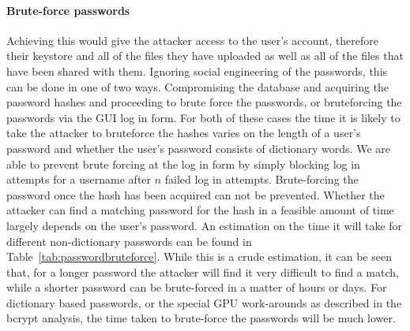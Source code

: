 \documentclass[12pt, titlepage]{article}
\begin{document}
\paragraph*{Brute-force passwords} Achieving this would give the attacker access to the user's account, therefore their keystore and all of the files they have uploaded as well as all of the files that have been shared with them. Ignoring social engineering of the passwords, this can be done in one of two ways. Compromising the database and acquiring the password hashes and proceeding to brute force the passwords, or bruteforcing the passwords via the GUI log in form. For both of these cases the time it is likely to take the attacker to bruteforce the hashes varies on the length of a user's password and whether the user's password consists of dictionary words. We are able to prevent brute forcing at the log in form by simply blocking log in attempts for a username after $n$ failed log in attempts. Brute-forcing the password once the hash has been acquired can not be prevented. Whether the attacker can find a matching password for the hash in a feasible amount of time largely depends on the user's password. An estimation on the time it will take for different non-dictionary passwords can be found in Table~\ref{tab:passwordbruteforce}. While this is a crude estimation, it can be seen that, for a longer password the attacker will find it very difficult to find a match, while a shorter password can be brute-forced in a matter of hours or days. For dictionary based passwords, or the special GPU work-arounds as described in the bcrypt analysis, the time taken to brute-force the passwords will be much lower.
\end{document}
